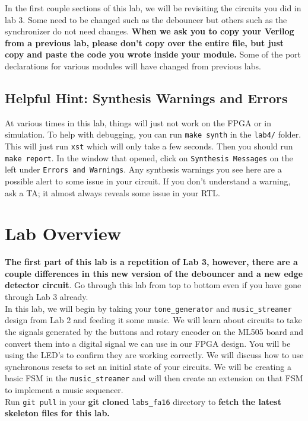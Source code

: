 \documentclass[11pt]{article}
\begin{document}
In the first couple sections of this lab, we will be revisiting the circuits you did in lab 3. Some need to be changed such as the debouncer but others such as the synchronizer do not need changes. \textbf{When we ask you to copy your Verilog from a previous lab, please don't copy over the entire file, but just copy and paste the code you wrote inside your module.} Some of the port declarations for various modules will have changed from previous labs.

\subsection{Helpful Hint: Synthesis Warnings and Errors}
At various times in this lab, things will just not work on the FPGA or in simulation. To help with debugging, you can run \verb|make synth| in the \verb|lab4/| folder. This will just run \verb|xst| which will only take a few seconds. Then you should run \verb|make report|. In the window that opened, click on \verb|Synthesis Messages| on the left under \verb|Errors and Warnings|. Any synthesis warnings you see here are a possible alert to some issue in your circuit. If you don't understand a warning, ask a TA; it almost always reveals some issue in your RTL.

\section{Lab Overview}

\textbf{The first part of this lab is a repetition of Lab 3, however, there are a couple differences in this new version of the debouncer and a new edge detector circuit}. Go through this lab from top to bottom even if you have gone through Lab 3 already.\\

In this lab, we will begin by taking your \verb|tone_generator| and \verb|music_streamer| design from Lab 2 and feeding it some music. We will learn about circuits to take the signals generated by the buttons and rotary encoder on the ML505 board and convert them into a digital signal we can use in our FPGA design. You will be using the LED's to confirm they are working correctly. We will discuss how to use synchronous resets to set an initial state of your circuits. We will be creating a basic FSM in the \verb|music_streamer| and will then create an extension on that FSM to implement a music sequencer. \\

Run \verb|git pull| in your \textbf{git cloned} \verb|labs_fa16| directory to \textbf{fetch the latest skeleton files for this lab.}
\end{document}
